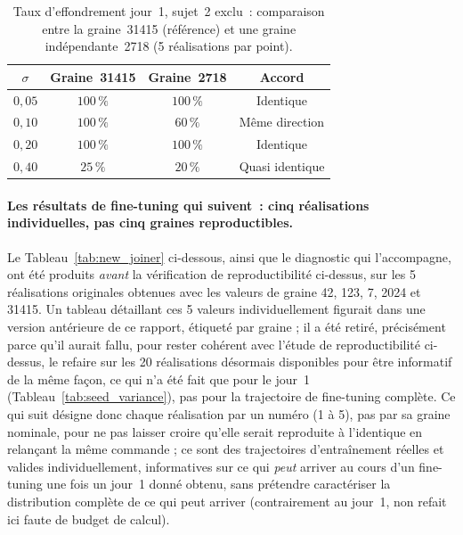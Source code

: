 \documentclass{acmart}
\begin{document}
\begin{table}[h!]
  \centering
  \small
  \caption{Taux d'effondrement jour~1, sujet~2 exclu~: comparaison entre
  la graine~31415 (référence) et une graine indépendante~2718 (5
  réalisations par point).}
  \label{tab:seed_replication}
  \begin{tabular}{cccc}
    \toprule
    $\sigma$ & Graine~31415 & Graine~2718 & Accord \\
    \midrule
    $0{,}05$ & $100\,\%$ & $100\,\%$ & Identique \\
    $0{,}10$ & $100\,\%$ & $60\,\%$ & Même direction \\
    $0{,}20$ & $100\,\%$ & $100\,\%$ & Identique \\
    $0{,}40$ & $25\,\%$ & $20\,\%$ & Quasi identique \\
    \bottomrule
  \end{tabular}
\end{table}

\paragraph{Les résultats de fine-tuning qui suivent~: cinq réalisations
individuelles, pas cinq graines reproductibles.} Le Tableau~\ref{tab:new_joiner}
ci-dessous, ainsi que le diagnostic qui l'accompagne, ont été produits
\emph{avant} la vérification de reproductibilité ci-dessus, sur les 5
réalisations originales obtenues avec les valeurs de graine 42, 123, 7,
2024 et 31415. Un tableau détaillant ces 5 valeurs individuellement
figurait dans une version antérieure de ce rapport, étiqueté par graine ;
il a été retiré, précisément parce qu'il aurait fallu, pour rester cohérent
avec l'étude de reproductibilité ci-dessus, le refaire sur les 20
réalisations désormais disponibles pour être informatif de la même façon,
ce qui n'a été fait que pour le jour~1 (Tableau~\ref{tab:seed_variance}),
pas pour la trajectoire de fine-tuning complète. Ce qui suit désigne donc
chaque réalisation par un numéro (1 à 5), pas par sa graine nominale, pour
ne pas laisser croire qu'elle serait reproduite à l'identique en relançant
la même commande ; ce sont des trajectoires d'entraînement réelles et
valides individuellement, informatives sur ce qui \emph{peut} arriver au
cours d'un fine-tuning une fois un jour~1 donné obtenu, sans prétendre
caractériser la distribution complète de ce qui peut arriver (contrairement
au jour~1, non refait ici faute de budget de calcul).
\end{document}
